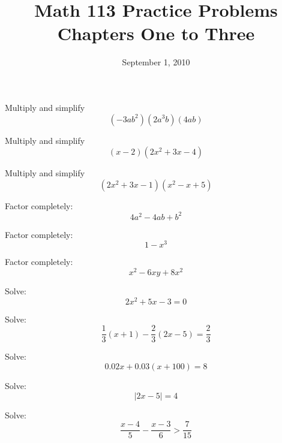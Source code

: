 \documentclass[fleqn,addpoints]{exam}
\title{Math 113 Practice Problems\\Chapters One to Three}
\date{September 1, 2010}
\begin{document}
\maketitle

\begin{questions}

\question 
Multiply and simplify
\[
  (-3ab^2)(2a^3b)(4ab)
\]
\vspace{1 cm}

\question 
Multiply and simplify
\[
  (x-2)(2x^2 + 3x - 4)
\]
\vspace{1 cm}

\question 
Multiply and simplify
\[
  (2x^2 + 3x - 1)(x^2 -x + 5)
\]
\vspace{1 cm}

\question 
Factor completely:
\[
  4a^2 - 4ab + b^2
\]
\vspace{1 cm}

\question 
Factor completely:
\[
  1 - x^3
\]
\vspace{1 cm}

\question 
Factor completely:
\[
  x^2 - 6xy + 8x^2
\]
\vspace{1 cm}

\question 
Solve:
\[
  2x^2 + 5x - 3 = 0
\]
\vspace{2 cm}

\question 
Solve:
\[
\frac{1}{3}(x + 1) - \frac{2}{3}(2x - 5) = \frac{2}{3}
\]
\vspace{2 cm}

\question 
Solve:
\[
0.02x + 0.03(x + 100) = 8
\]
\vspace{2 cm}

\question 
Solve:
\[
 |2x -5| = 4
\]
\vspace{2 cm}

\question 
Solve:
\[
  \frac{x-4}{5} - \frac{x-3}{6} > \frac{7}{15}
\]
\vspace{2 cm}



\end{questions}
\end{document}
